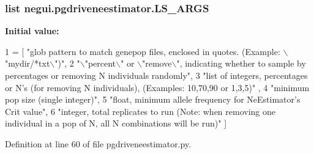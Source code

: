 \subsubsection[{\texorpdfstring{L\+S\+\_\+\+A\+R\+GS}{LS_ARGS}}]{\setlength{\rightskip}{0pt plus 5cm}list negui.\+pgdriveneestimator.\+L\+S\+\_\+\+A\+R\+GS}\hypertarget{namespacenegui_1_1pgdriveneestimator_a728846c66f219090e707bfce27506896}{}\label{namespacenegui_1_1pgdriveneestimator_a728846c66f219090e707bfce27506896}
{\bfseries Initial value\+:}
\begin{DoxyCode}
1 = [ \textcolor{stringliteral}{"glob pattern to match genepop files, enclosed in quotes. (Example: \(\backslash\)"mydir/*txt\(\backslash\)")"}, 
2         \textcolor{stringliteral}{"\(\backslash\)"percent\(\backslash\)" or \(\backslash\)"remove\(\backslash\)", indicating whether to sample by percentages or removing N individuals
       randomly"},
3         \textcolor{stringliteral}{"list of integers, percentages or N's (for removing N individuals),  (Examples: 10,70,90 or 1,3,5)"}
      , 
4         \textcolor{stringliteral}{"minimum pop size (single integer)"},
5         \textcolor{stringliteral}{"float, minimum allele frequency for NeEstimator's Crit value"},
6         \textcolor{stringliteral}{"integer, total replicates to run (Note: when removing one individual in a pop of N, all N
       combinations will be run)"} ]
\end{DoxyCode}


Definition at line 60 of file pgdriveneestimator.\+py.

